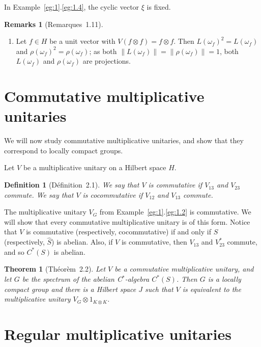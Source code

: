 \documentclass[a4paper,12pt]{article}
\theoremstyle{plain}
\newtheorem{theorem}[proposition]{Theorem}
\newtheorem{definition}[proposition]{Definition}
\theoremstyle{definition}
\newtheorem{remarks}[proposition]{Remarks}
\begin{document}
In Example~\ref{eg:1}.\ref{eg:1.4}, the cyclic vector $\xi$ is fixed.

\begin{remarks}[Remarques~1.11]
\begin{enumerate}
\item Let $f\in H$ be a unit vector with $V(f\otimes f)=f\otimes f$.
Then $L(\omega_f)^2 = L(\omega_f)$ and $\rho(\omega_f)^2 = \rho(\omega_f)$;
as both $\|L(\omega_f)\| = \|\rho(\omega_f)\| = 1$, both $L(\omega_f)$ and
$\rho(\omega_f)$ are projections.
\end{enumerate}
\end{remarks}





\section{Commutative multiplicative unitaries}

We will now study commutative multiplicative unitaries, and show that
they correspond to locally compact groups.

Let $V$ be a multiplicative unitary on a Hilbert space $H$.

\begin{definition}[D\'efinition~2.1]
We say that $V$ is \emph{commutative} if $V_{13}$ and $V_{23}$ commute.
We say that $V$ is \emph{cocommutative} if $V_{12}$ and $V_{13}$ commute.
\end{definition}

The multiplicative unitary $V_G$ from Example~\ref{eg:1}.\ref{eg:1.2} is
commutative.  We will show that every commutative multiplicative unitary
is of this form.  Notice that $V$ is commutative (respectively, cocommutative)
if and only if $S$ (respectively, $\hat S$) is abelian.  Also, if $V$ is
commutative, then $V_{13}$ and $V_{23}^*$ commute, and so $C^*(S)$ is abelian.

\begin{theorem}[Th\'eor\`em~2.2]
Let $V$ be a commutative multiplicative unitary, and let $G$ be the spectrum
of the abelian C$^*$-algebra $C^*(S)$.  Then $G$ is a locally compact group
and there is a Hilbert space $J$ such that $V$ is equivalent to the
multiplicative unitary $V_G \otimes 1_{K\otimes K}$.
\end{theorem}





\section{Regular multiplicative unitaries}
\end{document}
